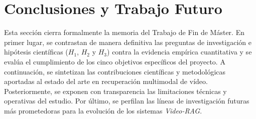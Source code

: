 \section{Conclusiones y Trabajo Futuro}
\label{sec:conclusiones_trabajo_futuro}

Esta sección cierra formalmente la memoria del Trabajo de Fin de Máster. En primer lugar, se contrastan de manera definitiva las preguntas de investigación e hipótesis científicas ($H_1$, $H_2$ y $H_3$) contra la evidencia empírica cuantitativa y se evalúa el cumplimiento de los cinco objetivos específicos del proyecto. A continuación, se sintetizan las contribuciones científicas y metodológicas aportadas al estado del arte en recuperación multimodal de vídeo. Posteriormente, se exponen con transparencia las limitaciones técnicas y operativas del estudio. Por último, se perfilan las líneas de investigación futuras más prometedoras para la evolución de los sistemas \textit{Video-RAG}.


\newpage


\newpage


\newpage


